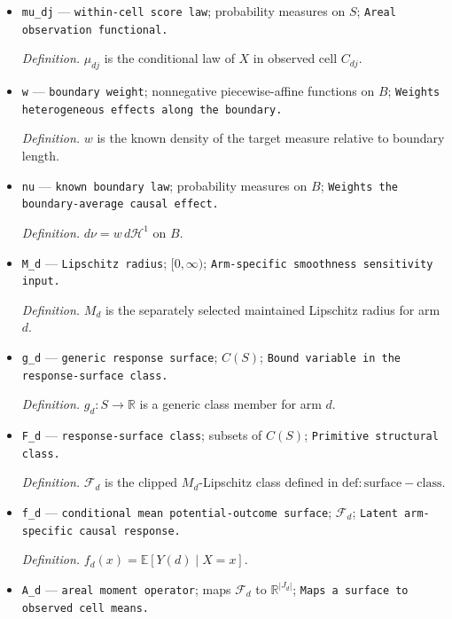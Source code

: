\documentclass{article}
\begin{document}
\begin{itemize}
  \item \texttt{mu\_\allowbreak{}dj} --- \texttt{within-\allowbreak{}cell score law}; probability measures on \(S\); \texttt{Areal observation functional.}
  \par\smallskip\noindent\emph{Definition.} \(\mu_{dj}\) is the conditional law of \(X\) in observed cell \(C_{dj}\).
  \item \texttt{w} --- \texttt{boundary weight}; nonnegative piecewise-affine functions on \(B\); \texttt{Weights heterogeneous effects along the boundary.}
  \par\smallskip\noindent\emph{Definition.} \(w\) is the known density of the target measure relative to boundary length.
  \item \texttt{nu} --- \texttt{known boundary law}; probability measures on \(B\); \texttt{Weights the boundary-\allowbreak{}average causal effect.}
  \par\smallskip\noindent\emph{Definition.} \(d\nu=w\,d\mathcal H^1\) on \(B\).
  \item \texttt{M\_\allowbreak{}d} --- \texttt{Lipschitz radius}; \([0,\infty)\); \texttt{Arm-\allowbreak{}specific smoothness sensitivity input.}
  \par\smallskip\noindent\emph{Definition.} \(M_d\) is the separately selected maintained Lipschitz radius for arm \(d\).
  \item \texttt{g\_\allowbreak{}d} --- \texttt{generic response surface}; \(C(S)\); \texttt{Bound variable in the response-\allowbreak{}surface class.}
  \par\smallskip\noindent\emph{Definition.} \(g_d:S\to\mathbb R\) is a generic class member for arm \(d\).
  \item \texttt{F\_\allowbreak{}d} --- \texttt{response-\allowbreak{}surface class}; subsets of \(C(S)\); \texttt{Primitive structural class.}
  \par\smallskip\noindent\emph{Definition.} \(\mathcal F_d\) is the clipped \(M_d\)-Lipschitz class defined in \(\mathrm{def:surface-class}\).
  \item \texttt{f\_\allowbreak{}d} --- \texttt{conditional mean potential-\allowbreak{}outcome surface}; \(\mathcal F_d\); \texttt{Latent arm-\allowbreak{}specific causal response.}
  \par\smallskip\noindent\emph{Definition.} \(f_d(x)=\mathbb E[Y(d)\mid X=x]\).
  \item \texttt{A\_\allowbreak{}d} --- \texttt{areal moment operator}; maps \(\mathcal F_d\) to \(\mathbb R^{|J_d|}\); \texttt{Maps a surface to observed cell means.}

\end{itemize}
\end{document}
